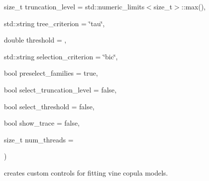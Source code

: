{\begin{DoxyParamCaption}
\item[{size\+\_\+t}]{truncation\+\_\+level = {\ttfamily std\+:\+:numeric\+\_\+limits$<$size\+\_\+t$>$\+:\+:max()}, }
\item[{std\+::string}]{tree\+\_\+criterion = {\ttfamily \char`\"{}tau\char`\"{}}, }
\item[{double}]{threshold = {}, }
\item[{std\+::string}]{selection\+\_\+criterion = {\ttfamily \char`\"{}bic\char`\"{}}, }
\item[{bool}]{preselect\+\_\+families = {\ttfamily true}, }
\item[{bool}]{select\+\_\+truncation\+\_\+level = {\ttfamily false}, }
\item[{bool}]{select\+\_\+threshold = {\ttfamily false}, }
\item[{bool}]{show\+\_\+trace = {\ttfamily false}, }
\item[{size\+\_\+t}]{num\+\_\+threads = {}}
\end{DoxyParamCaption}
)\hspace{0.3cm}{\ttfamily [inline]}}\hypertarget{classvinecopulib_1_1_fit_controls_vinecop_a49c04024ca2d54bc45c7edada869b00b}{}\label{classvinecopulib_1_1_fit_controls_vinecop_a49c04024ca2d54bc45c7edada869b00b}
creates custom controls for fitting vine copula models. 
